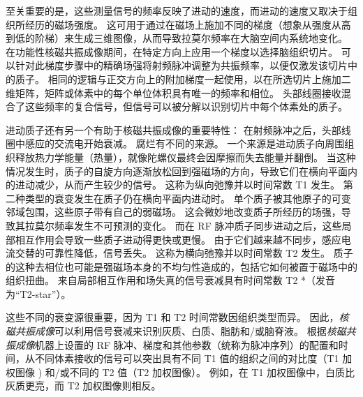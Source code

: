 至关重要的是，这些测量信号的频率反映了进动的速度，而进动的速度又取决于组织所经历的磁场强度。
这可用于通过在磁场上施加不同的梯度（想象从强度从高到低的阶梯）来生成三维图像，从而导致拉莫尔频率在大脑空间内系统地变化。
在功能性核磁共振成像期间，在特定方向上应用一个梯度以选择脑组织切片。
可以针对此梯度步骤中的精确场强将射频脉冲调整为共振频率，以便仅激发该切片中的质子。
相同的逻辑与正交方向上的附加梯度一起使用，以在所选切片上施加二维矩阵，矩阵或体素中的每个单位体积具有唯一的频率和相位。
头部线圈接收混合了这些频率的复合信号，但信号可以被分解以识别切片中每个体素处的质子。


进动质子还有另一个有助于核磁共振成像的重要特性：
在射频脉冲之后，头部线圈中感应的交流电开始衰减。 
腐烂有不同的来源。 
一个来源是进动质子向周围组织释放热力学能量（热量），就像陀螺仪最终会因摩擦而失去能量并翻倒。 
当这种情况发生时，质子的自旋方向逐渐放松回到强磁场的方向，导致它们在横向平面内的进动减少，从而产生较少的信号。 
这称为纵向弛豫并以时间常数 T1 发生。 
第二种类型的衰变发生在质子仍在横向平面内进动时。 
单个质子被其他原子的可变邻域包围，这些原子带有自己的弱磁场。 
这会微妙地改变质子所经历的场强，导致其拉莫尔频率发生不可预测的变化。 
而在 RF 脉冲质子同步进动之后，这些局部相互作用会导致一些质子进动得更快或更慢。 
由于它们越来越不同步，感应电流交替的可靠性降低，信号丢失。 
这称为横向弛豫并以时间常数 T2 发生。 
质子的这种去相位也可能是强磁场本身的不均匀性造成的，包括它如何被置于磁场中的组织扭曲。 
来自局部相互作用和场失真的信号衰减具有时间常数 T2 *（发音为“T2-star”）。


这些不同的衰变源很重要，因为 T1 和 T2 时间常数因组织类型而异。 
因此，\textit{核磁共振成像}可以利用信号衰减来识别灰质、白质、脂肪和/或脑脊液。 
根据\textit{核磁共振成像}机器上设置的 RF 脉冲、梯度和其他参数（统称为脉冲序列）的配置和时间，从不同体素接收的信号可以突出具有不同 T1 值的组织之间的对比度（T1 加权图像 ) 和/或不同的 T2 值（T2 加权图像）。 
例如，在 T1 加权图像中，白质比灰质更亮，而 T2 加权图像则相反。


